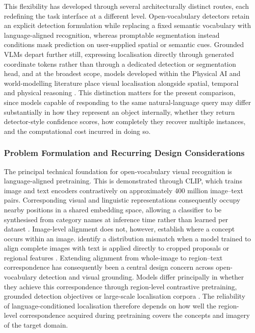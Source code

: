This flexibility has developed through several architecturally distinct routes, each redefining the task interface at a different level. Open-vocabulary detectors retain an explicit detection formulation while replacing a fixed semantic vocabulary with language-aligned recognition, whereas promptable segmentation instead conditions mask prediction on user-supplied spatial or semantic cues. Grounded \glspl{VLM} depart further still, expressing localisation directly through generated coordinate tokens rather than through a dedicated detection or segmentation head, and at the broadest scope, models developed within the Physical \gls{AI} and world-modelling literature place visual localisation alongside spatial, temporal and physical reasoning \cite{zhu2024openvocabulary,xiao2026grounding,xiang2026physicalai}. This distinction matters for the present comparison, since models capable of responding to the same natural-language query may differ substantially in how they represent an object internally, whether they return detector-style confidence scores, how completely they recover multiple instances, and the computational cost incurred in doing so.


\subsubsection{Problem Formulation and Recurring Design Considerations}
\label{sec:bg-zs-formulation}
The principal technical foundation for open-vocabulary visual recognition is language-aligned pretraining. This is demonstrated through \gls{CLIP}, which trains image and text encoders contrastively on approximately 400 million image--text pairs. Corresponding visual and linguistic representations consequently occupy nearby positions in a shared embedding space, allowing a classifier to be synthesised from category names at inference time rather than learned per dataset \cite{radford2021learning,zhang2024vlmsurvey}. Image-level alignment does not, however, establish where a concept occurs within an image. \citeauthor{BG37-open-vocabulary} identify a distribution mismatch when a model trained to align complete images with text is applied directly to cropped proposals or regional features \cite{BG37-open-vocabulary}. Extending alignment from whole-image to region--text correspondence has consequently been a central design concern across open-vocabulary detection and visual grounding. Models differ principally in whether they achieve this correspondence through region-level contrastive pretraining, grounded detection objectives or large-scale localisation corpora \cite{zhu2024openvocabulary,xiao2026grounding}. The reliability of language-conditioned localisation therefore depends on how well the region-level correspondence acquired during pretraining covers the concepts and imagery of the target domain.

